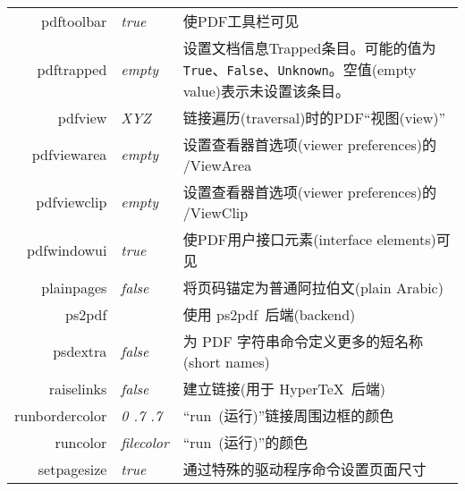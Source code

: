 \documentclass{article}
\begin{document}
\begin{longtable}{@{}>{\ttfamily}rlp{7cm}@{}}
  pdftoolbar                        & \textit{true}          & 使PDF工具栏可见                                                                                       \\
  pdftrapped                        & \textit{empty}         & 设置文档信息Trapped条目。可能的值为 \texttt{True}、\texttt{False}、\texttt{Unknown}。空值(empty value)表示未设置该条目。    \\
  pdfview                           & \textit{XYZ}           & 链接遍历(traversal)时的PDF“视图(view)”                                                                  \\
  pdfviewarea                       & \textit{empty}         & 设置查看器首选项(viewer preferences)的 /ViewArea                                                         \\
  pdfviewclip                       & \textit{empty}         & 设置查看器首选项(viewer preferences)的 /ViewClip                                                         \\
  pdfwindowui                       & \textit{true}          & 使PDF用户接口元素(interface elements)可见                                                                \\
  plainpages                        & \textit{false}         & 将页码锚定为普通阿拉伯文(plain Arabic)                                                                      \\
  ps2pdf                            &                        & 使用 \textsf{ps2pdf}\ 后端(backend)                                                                 \\
  psdextra                          & \textit{false}         & 为 PDF 字符串命令定义更多的短名称(short names)                                                                \\
  raiselinks                        & \textit{false}         & 建立链接(用于 \textsf{Hyper\TeX}\ 后端)                                                                 \\
  runbordercolor                    & \textit{0 .7 .7}       & “run~(运行)”链接周围边框的颜色                                                                             \\
  runcolor                          & \textit{filecolor}     & “run~(运行)”的颜色                                                                                   \\
  setpagesize                       & \textit{true}          & 通过特殊的驱动程序命令设置页面尺寸                                                                               \\

\end{longtable}
\end{document}
